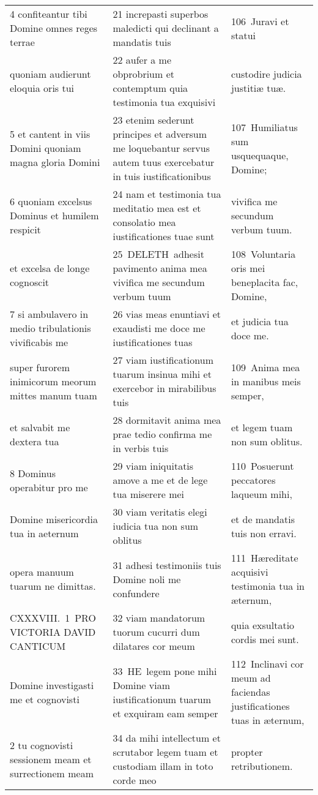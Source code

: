 \documentclass{article}
\begin{document}
\begin{longtable}{@{}p{}p{}p{}@{}}
4 confiteantur tibi Domine omnes reges terrae	&	21 increpasti superbos maledicti qui declinant a mandatis tuis	&	106 Juravi et statui	\\
quoniam audierunt eloquia oris tui	&	22 aufer a me obprobrium et contemptum quia testimonia tua exquisivi	&	custodire judicia justitiæ tuæ.	\\
5 et cantent in viis Domini quoniam magna gloria Domini	&	23 etenim sederunt principes et adversum me loquebantur servus autem tuus exercebatur in tuis iustificationibus	&	107 Humiliatus sum usquequaque, Domine;	\\
6 quoniam excelsus Dominus et humilem respicit	&	24 nam et testimonia tua meditatio mea est et consolatio mea iustificationes tuae sunt	&	vivifica me secundum verbum tuum.	\\
et excelsa de longe cognoscit	&	25 DELETH adhesit pavimento anima mea vivifica me secundum verbum tuum	&	108 Voluntaria oris mei beneplacita fac, Domine,	\\
7 si ambulavero in medio tribulationis vivificabis me	&	26 vias meas enuntiavi et exaudisti me doce me iustificationes tuas	&	et judicia tua doce me.	\\
super furorem inimicorum meorum mittes manum tuam	&	27 viam iustificationum tuarum insinua mihi et exercebor in mirabilibus tuis	&	109 Anima mea in manibus meis semper,	\\
et salvabit me dextera tua	&	28 dormitavit anima mea prae tedio confirma me in verbis tuis	&	et legem tuam non sum oblitus.	\\
8 Dominus operabitur pro me	&	29 viam iniquitatis amove a me et de lege tua miserere mei	&	110 Posuerunt peccatores laqueum mihi,	\\
Domine misericordia tua in aeternum	&	30 viam veritatis elegi iudicia tua non sum oblitus	&	et de mandatis tuis non erravi.	\\
opera manuum tuarum ne dimittas.	&	31 adhesi testimoniis tuis Domine noli me confundere	&	111 Hæreditate acquisivi testimonia tua in æternum,	\\
CXXXVIII. 1 PRO VICTORIA DAVID CANTICUM	&	32 viam mandatorum tuorum cucurri dum dilatares cor meum	&	quia exsultatio cordis mei sunt.	\\
Domine investigasti me et cognovisti	&	33 HE legem pone mihi Domine viam iustificationum tuarum et exquiram eam semper	&	112 Inclinavi cor meum ad faciendas justificationes tuas in æternum,	\\
2 tu cognovisti sessionem meam et surrectionem meam	&	34 da mihi intellectum et scrutabor legem tuam et custodiam illam in toto corde meo	&	propter retributionem.	\\

\end{longtable}
\end{document}
